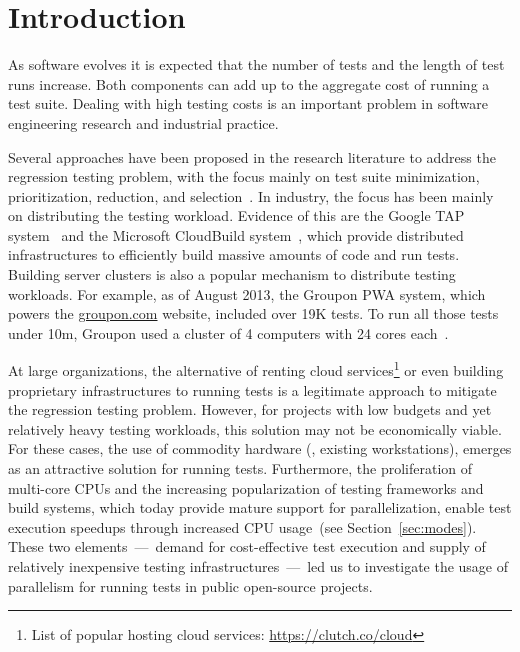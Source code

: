 \section{Introduction}


As software evolves it is expected that the number of tests and the
length of test runs increase.  Both components can add up to the
aggregate cost of running a test suite.  Dealing with high testing
costs is an important problem in software engineering research and
industrial practice.

Several approaches have been proposed in the research literature to
address the regression testing problem, with the focus mainly on test
suite minimization, prioritization, reduction, and
selection~\cite{yoo-harman-stvr2012}.  In industry, the focus has been
mainly on distributing the testing workload.  Evidence of this are the
Google TAP system~\cite{google-tap,google-ci} and the Microsoft
CloudBuild system~\cite{prasad-shulte-ieee-microsoft-ci}, which
provide distributed infrastructures to efficiently build massive
amounts of code and run tests.  Building server clusters is also a
popular mechanism to distribute testing workloads.  For example, as of
August 2013, the Groupon PWA system, which powers the
\url{groupon.com} website, included over 19K tests.  To run all those
tests under 10m, Groupon used a cluster of 4 computers with 24 cores
each~\cite{kim-etal-fse2013}.

At large organizations, the alternative of renting cloud
services\footnote{List of popular hosting cloud services:
  \url{https://clutch.co/cloud}} or even building proprietary
infrastructures to running tests is a legitimate approach to mitigate
the regression testing problem.  However, for projects with low
budgets and yet relatively heavy testing workloads, this solution may
not be economically viable.  For these cases, the use of commodity
hardware (\eg{}, existing workstations), emerges as an attractive
solution for running tests.  Furthermore, the proliferation of
multi-core CPUs and the increasing popularization of testing
frameworks and build systems, which today provide mature support for
parallelization, enable test execution speedups through increased CPU
usage~(see Section~\ref{sec:modes}).  These two elements~---~demand
for cost-effective test execution and supply of relatively inexpensive
testing infrastructures~---~led us to investigate the usage of
parallelism for running tests in public open-source projects.

